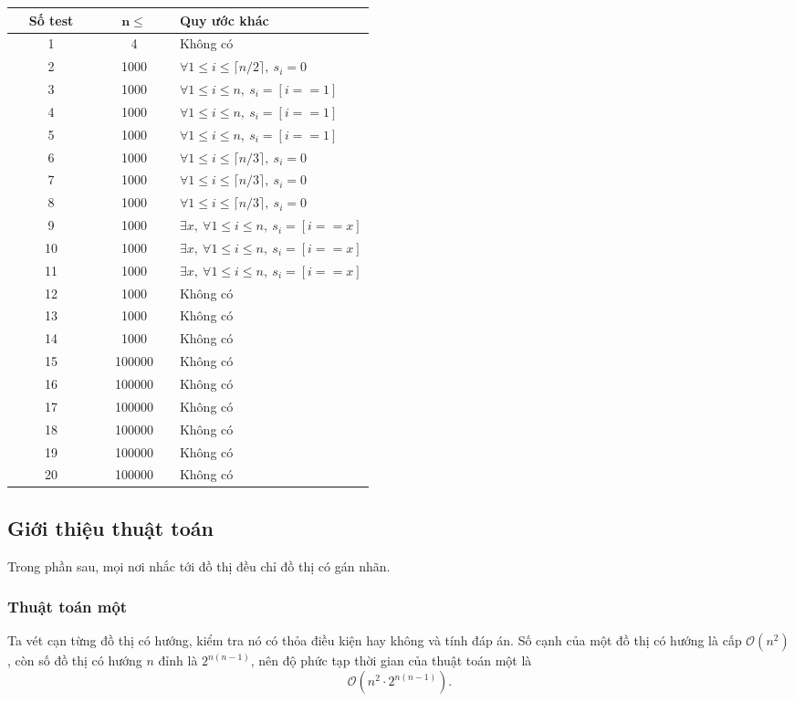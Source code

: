 \documentclass[11pt]{article}
\newcommand{\Oh}{\mathcal{O}}
\begin{document}
\begin{center}
\small
\begin{tabular}{c c p{0.54\linewidth}}
\textbf{Số test} & \(\boldsymbol{n\le}\) & \textbf{Quy ước khác}\\
\hline
1 & 4 & Không có\\
2 & 1000 & \(\forall 1\le i\le \lceil n/2\rceil,\ s_i=0\)\\
3 & 1000 & \(\forall 1\le i\le n,\ s_i=[i==1]\)\\
4 & 1000 & \(\forall 1\le i\le n,\ s_i=[i==1]\)\\
5 & 1000 & \(\forall 1\le i\le n,\ s_i=[i==1]\)\\
6 & 1000 & \(\forall 1\le i\le \lceil n/3\rceil,\ s_i=0\)\\
7 & 1000 & \(\forall 1\le i\le \lceil n/3\rceil,\ s_i=0\)\\
8 & 1000 & \(\forall 1\le i\le \lceil n/3\rceil,\ s_i=0\)\\
9 & 1000 & \(\exists x,\ \forall 1\le i\le n,\ s_i=[i==x]\)\\
10 & 1000 & \(\exists x,\ \forall 1\le i\le n,\ s_i=[i==x]\)\\
11 & 1000 & \(\exists x,\ \forall 1\le i\le n,\ s_i=[i==x]\)\\
12 & 1000 & Không có\\
13 & 1000 & Không có\\
14 & 1000 & Không có\\
15 & 100000 & Không có\\
16 & 100000 & Không có\\
17 & 100000 & Không có\\
18 & 100000 & Không có\\
19 & 100000 & Không có\\
20 & 100000 & Không có
\end{tabular}
\end{center}

\subsection{Giới thiệu thuật toán}

Trong phần sau, mọi nơi nhắc tới đồ thị đều chỉ đồ thị có gán nhãn.

\subsubsection{Thuật toán một}

Ta vét cạn từng đồ thị có hướng, kiểm tra nó có thỏa điều kiện hay không và
tính đáp án. Số cạnh của một đồ thị có hướng là cấp \(\Oh(n^2)\), còn số đồ
thị có hướng \(n\) đỉnh là \(2^{n(n-1)}\), nên độ phức tạp thời gian của thuật
toán một là
\[
  \Oh\left(n^2\cdot 2^{n(n-1)}\right).
\]
\end{document}

